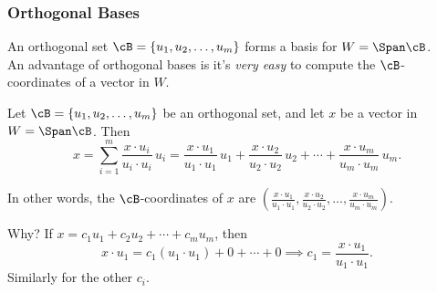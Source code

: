 \begin{frame}
\frametitle{Orthogonal Bases}

An orthogonal set $\cB = \{u_1,u_2,\ldots,u_m\}$ forms a basis for
$W = \Span\cB$.\\[1mm]
\pause
An advantage of orthogonal bases is it's \emph{very easy} to compute the
$\cB$-coordinates of a vector in $W$.

\pause
\begin{thm}
  Let $\cB = \{u_1,u_2,\ldots,u_m\}$ be an orthogonal set, and let $x$ be a
  vector in $W = \Span\cB$.  Then
  \[ x = \sum_{i=1}^m \frac{x\cdot u_i}{u_i\cdot u_i}\,u_i
  = \frac{x\cdot u_1}{u_1\cdot u_1}\,u_1 + \frac{x\cdot u_2}{u_2\cdot u_2}\,u_2
  + \cdots + \frac{x\cdot u_m}{u_m\cdot u_m}\,u_m. \]
\end{thm}

\pause
In other words, the $\cB$-coordinates of $x$ are
$\displaystyle\left(\frac{x\cdot u_1}{u_1\cdot u_1},
  \frac{x\cdot u_2}{u_2\cdot u_2},\ldots,
\frac{x\cdot u_m}{u_m\cdot u_m} \right)$.

\medskip
\begin{webonly}
\alert{Why?}
If $x = c_1u_1 + c_2u_2 + \cdots + c_mu_m$, then
\[ x\cdot u_1 = c_1(u_1\cdot u_1) + 0 + \cdots + 0 \implies c_1 =
\frac{x\cdot u_1}{u_1\cdot u_1}. \]
Similarly for the other $c_i$.
\end{webonly}

\end{frame}



